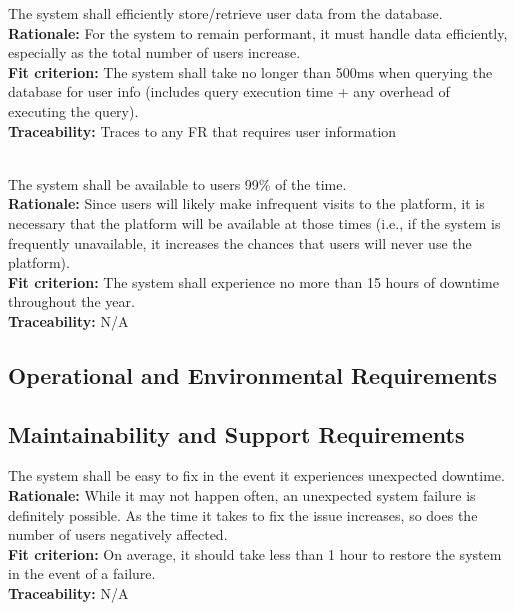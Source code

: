 \documentclass[12pt, titlepage]{article}
\newcounter{NFR_Counter}
\newcounter{FR_Counter}
\begin{document}
The system shall efficiently store/retrieve user data from the database.\\
\textbf{Rationale:}
For the system to remain performant, it must handle data efficiently, especially as the total number of users increase.\\
\textbf{Fit criterion:}
The system shall take no longer than 500ms when querying the database for user info (includes query execution time + any overhead of executing 
the query).\\
\textbf{Traceability:}
Traces to any FR that requires user information \\~\\
\addtocounter{NFR_Counter}{1}

The system shall be available to users 99\% of the time.\\
\textbf{Rationale:}
Since users will likely make infrequent visits to the platform, it is necessary that the platform will be available at those 
times (i.e., if the system is frequently unavailable, it increases the chances that users will never use the platform).\\
\textbf{Fit criterion:}
The system shall experience no more than 15 hours of downtime throughout the year.\\
\textbf{Traceability:}
N/A
\addtocounter{NFR_Counter}{1}

\subsection{Operational and Environmental Requirements}

\subsection{Maintainability and Support Requirements}


The system shall be easy to fix in the event it experiences unexpected downtime.\\
\textbf{Rationale:}
While it may not happen often, an unexpected system failure is definitely possible. As the time it takes 
to fix the issue increases, so does the number of users negatively affected.\\
\textbf{Fit criterion:}
On average, it should take less than 1 hour to restore the system in the event of a failure.\\
\textbf{Traceability:}
N/A \\~\\
\addtocounter{NFR_Counter}{1}
\end{document}

